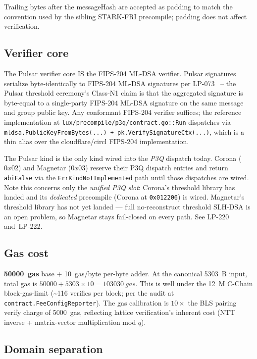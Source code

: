 Trailing bytes after the messageHash are accepted as padding to
match the convention used by the sibling STARK-FRI precompile;
padding does not affect verification.

\subsection{Verifier core}

The Pulsar verifier core IS the FIPS-204 ML-DSA verifier. Pulsar
signatures serialize byte-identically to FIPS-204 ML-DSA
signatures per LP-073~\cite{lp073} -- the Pulsar threshold
ceremony's Class-N1 claim is that the aggregated signature is
byte-equal to a single-party FIPS-204 ML-DSA signature on the
same message and group public key. Any conformant FIPS-204
verifier suffices; the reference implementation at
\texttt{lux/precompile/p3q/contract.go::Run} dispatches via
\texttt{mldsa.PublicKeyFromBytes(...) + pk.VerifySignatureCtx(...)},
which is a thin alias over the cloudflare/circl FIPS-204
implementation.

The Pulsar kind is the only kind wired into the \emph{P3Q} dispatch
today. Corona ($0x02$) and Magnetar ($0x03$) reserve their P3Q dispatch
entries and return \texttt{abiFalse} via the
\texttt{ErrKindNotImplemented} path until those dispatches are wired.
Note this concerns only the \emph{unified P3Q slot}: Corona's threshold
library has landed and its \emph{dedicated} precompile (Corona at
\texttt{0x012206}) is wired. Magnetar's threshold library has not yet
landed --- full no-reconstruct threshold SLH-DSA is an open problem, so
Magnetar stays fail-closed on every path. See LP-220 and~LP-222.

\subsection{Gas cost}

\textbf{\SI{50000}{gas}} base $+$ \SI{10}{gas/byte} per-byte
adder. At the canonical \SI{5303}{B} input, total gas is
$50000 + 5303 \times 10 = \SI{103030}{gas}$. This is well under
the \SI{12}{M} C-Chain block-gas-limit (\textasciitilde 116
verifies per block; per the audit at
\texttt{contract.FeeConfigReporter}). The gas calibration is
$10\times$ the BLS pairing verify charge of \SI{5000}{gas},
reflecting lattice verification's inherent cost (NTT inverse +
matrix-vector multiplication mod $q$).

\subsection{Domain separation}

